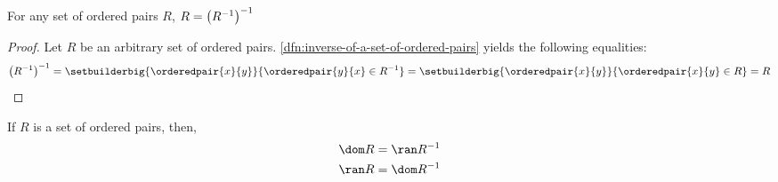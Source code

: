 \begin{thm}
    \label{thm:inverse-of-the-inverse-of-a-set-of-ordered-pairs-is-the-set-itself}
    For any set of ordered pairs \( R \), \( R = \mleft( R^{-1} \mright)^{-1} \)
\end{thm}

\begin{proof}
    Let \( R \) be an arbitrary set of ordered pairs. \cref{dfn:inverse-of-a-set-of-ordered-pairs} yields the following equalities:
    \begin{equation*}
        \mleft( R^{-1} \mright)^{-1}
        = \setbuilderbig{\orderedpair{x}{y}}{\orderedpair{y}{x} \in R^{-1}}
        = \setbuilderbig{\orderedpair{x}{y}}{\orderedpair{x}{y} \in R}
        = R \qedhere
    \end{equation*}
\end{proof}

\begin{thm}
    \label{thm:domain-is-the-range-of-inverse-and-vice-versa}
    If \( R \) is a set of ordered pairs, then,
    \begin{gather*}
        \dom R = \ran R^{-1} \\
        \ran R = \dom R^{-1}
    \end{gather*}
\end{thm}

